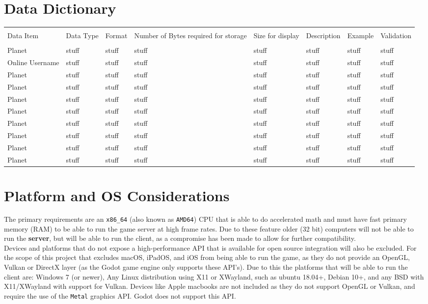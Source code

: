 \documentclass[12pt, DIV=calc]{scrartcl}
\begin{document}
\section{Data Dictionary}
\begin{xltabular}[c]{\textwidth}{| X | X | X | X | X | X | X | X |}
    \hline \\
Data Item & Data Type & Format & Number of Bytes required for storage & Size for display & Description  & Example & Validation \\
    \hline \hline \\
Planet & stuff & stuff & stuff & stuff & stuff & stuff & stuff \\ \hline
Online Username & stuff & stuff & stuff & stuff & stuff & stuff & stuff \\ \hline
Planet & stuff & stuff & stuff & stuff & stuff & stuff & stuff \\ \hline
Planet & stuff & stuff & stuff & stuff & stuff & stuff & stuff \\ \hline
Planet & stuff & stuff & stuff & stuff & stuff & stuff & stuff \\ \hline
Planet & stuff & stuff & stuff & stuff & stuff & stuff & stuff \\ \hline
Planet & stuff & stuff & stuff & stuff & stuff & stuff & stuff \\ \hline
Planet & stuff & stuff & stuff & stuff & stuff & stuff & stuff \\ \hline
Planet & stuff & stuff & stuff & stuff & stuff & stuff & stuff \\ \hline
Planet & stuff & stuff & stuff & stuff & stuff & stuff & stuff \\ \hline
    \hline
\end{xltabular}

\section{Platform and OS Considerations}
The primary requirements are an \texttt{x86\_64} (also known as \texttt{AMD64}) CPU that is able to do accelerated math and must have fast primary memory (RAM) to be able to run the game server at high frame rates. Due to these feature older (32 bit) computers will not be able to run the \textbf{server}, but will be able to run the client, as a compromise has been made to allow for further compatibility. \\

\noindent Devices and platforms that do not expose a high-performance API that is available for open source integration will also be excluded. For the scope of this project that excludes macOS, iPadOS, and iOS from being able to run the game, as they do not provide an OpenGL, Vulkan or DirectX layer (as the Godot game engine only supports these API's). Due to this the platforms that will be able to run the client are: Windows 7 (or newer), Any Linux distribution using X11 or XWayland, such as ubuntu 18.04+, Debian 10+, and any BSD with X11/XWayland with support for Vulkan. Devices like Apple macbooks are not included as they do not support OpenGL or Vulkan, and require the use of the \texttt{Metal} graphics API. Godot does not support this API.
\end{document}

